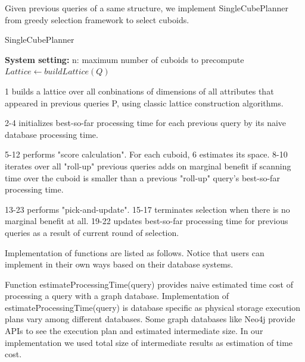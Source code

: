 Given previous queries of a same structure, we implement  SingleCubePlanner from greedy selection framework to select cuboids. 

\begin{algorithm}[H]
	\caption{SingleCubePlanner}
	\LinesNumbered 
	\textbf{System setting:} n: maximum number of cuboids to precompute\\ 
	$Lattice \leftarrow buildLattice(Q)$\;
	
\end{algorithm}
\clearpage

1 builds a lattice over all conbinations of dimensions of all attributes that appeared in previous queries P, using classic lattice construction algorithms.

2-4 initializes best-so-far processing time for each previous query by its naive database processing time.

5-12 performs "score calculation". For each cuboid, 6 estimates its space. 8-10 iterates over all "roll-up" previous queries adds on marginal benefit if scanning time over the cuboid is smaller than a previous "roll-up" query's best-so-far processing time.

13-23 performs "pick-and-update". 15-17 terminates selection when there is no marginal benefit at all. 19-22 updates best-so-far processing time for previous queries as a result of current round of selection.

Implementation of functions are listed as follows. Notice that users can implement in their own ways based on their database systems. 

Function estimateProcessingTime(query) provides naive estimated time cost of processing a query with a graph database. Implementation of estimateProcessingTime(query) is database specific as physical storage execution plans vary among different databases. Some graph databases like Neo4j provide APIs to see the execution plan and estimated intermediate size. In our implementation we used total size of intermediate results as estimation of time cost.
  
